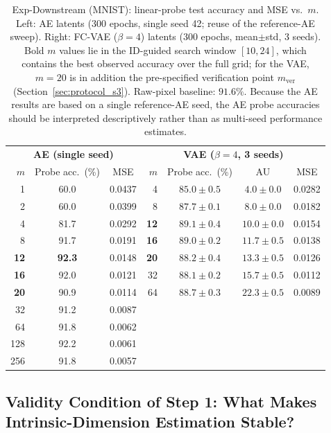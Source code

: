 \documentclass[make,article,submit,pdftex,moreauthors]{Definitions/mdpi}
\begin{document}
\begin{table}[H]
\caption{Exp-Downstream (MNIST): linear-probe test accuracy and MSE vs.\
$m$. Left: AE latents (300 epochs, single seed 42; reuse of the
reference-AE sweep). Right: FC-VAE ($\beta = 4$) latents (300 epochs,
mean$\pm$std, 3 seeds). Bold $m$ values lie in the ID-guided search window
$[10, 24]$, which contains the best observed accuracy over the full grid;
for the VAE, $m = 20$ is in addition the pre-specified verification point
$m_{\mathrm{ver}}$ (Section~\ref{sec:protocol_s3}).
Raw-pixel baseline: $91.6\%$.
Because the AE results are based on a single reference-AE seed, the AE
probe accuracies should be interpreted descriptively rather than as
multi-seed performance estimates.}
\label{tab:downstream}
\small
\begin{tabular}{r cc | r ccc}
\toprule
\multicolumn{3}{c|}{\textbf{AE (single seed)}} & \multicolumn{4}{c}{\textbf{VAE ($\beta = 4$, 3 seeds)}} \\
$m$ & Probe acc.\ (\%) & MSE & $m$ & Probe acc.\ (\%) & AU & MSE \\
\midrule
1 & 60.0 & 0.0437 & 4 & $85.0 \pm 0.5$ & $4.0 \pm 0.0$ & 0.0282 \\
2 & 60.0 & 0.0399 & 8 & $87.7 \pm 0.1$ & $8.0 \pm 0.0$ & 0.0182 \\
4 & 81.7 & 0.0292 & \textbf{12} & $\boldsymbol{89.1 \pm 0.4}$ & $10.0 \pm 0.0$ & 0.0154 \\
8 & 91.7 & 0.0191 & \textbf{16} & $89.0 \pm 0.2$ & $11.7 \pm 0.5$ & 0.0138 \\
\textbf{12} & \textbf{92.3} & 0.0148 & \textbf{20} & $88.2 \pm 0.4$ & $13.3 \pm 0.5$ & 0.0126 \\
\textbf{16} & 92.0 & 0.0121 & 32 & $88.1 \pm 0.2$ & $15.7 \pm 0.5$ & 0.0112 \\
\textbf{20} & 90.9 & 0.0114 & 64 & $88.7 \pm 0.3$ & $22.3 \pm 0.5$ & 0.0089 \\
32 & 91.2 & 0.0087 &  & & & \\
64 & 91.8 & 0.0062 &  & & & \\
128 & 92.2 & 0.0061 &  & & & \\
256 & 91.8 & 0.0057 &  & & & \\
\bottomrule
\end{tabular}
\end{table}

\subsection{Validity Condition of Step 1: What Makes Intrinsic-Dimension Estimation Stable?}\label{sec:exp_real_geom}
\end{document}
